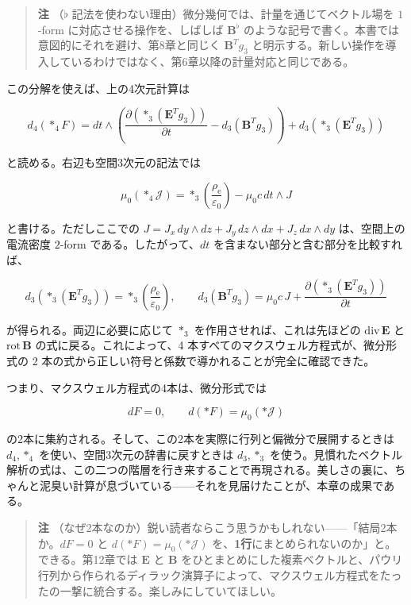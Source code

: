 \documentclass[a4paper,12pt,openany]{book}
\begin{document}
\begin{quote}
\textbf{注} （\(\flat\)
記法を使わない理由）微分幾何では、計量を通じてベクトル場を \(1\)-form
に対応させる操作を、しばしば \(\mathbf{B}^\flat\)
のような記号で書く。本書では意図的にそれを避け、第8章と同じく
\(\mathbf{B}^T g_3\)
と明示する。新しい操作を導入しているわけではなく、第6章以降の計量対応と同じである。
\end{quote}

この分解を使えば、上の4次元計算は

\[
d_4(\ast_4F)=dt\wedge\left(\frac{\partial(\ast_3(\mathbf{E}^T g_3))}{\partial t}-d_3(\mathbf{B}^T g_3)\right)+d_3(\ast_3(\mathbf{E}^T g_3))
\]

と読める。右辺も空間3次元の記法では

\[
\mu_0(\ast_4\mathcal J)=\ast_3\left(\frac{\rho_{\mathrm e}}{\varepsilon_0}\right)-\mu_0 c\,dt\wedge J
\]

と書ける。ただしここでの
\(J=J_x\,dy\wedge dz+J_y\,dz\wedge dx+J_z\,dx\wedge dy\)
は、空間上の電流密度 \(2\)-form である。したがって、\(dt\)
を含まない部分と含む部分を比較すれば、

\[
d_3(\ast_3(\mathbf{E}^T g_3))=\ast_3\left(\frac{\rho_{\mathrm e}}{\varepsilon_0}\right),
\qquad
d_3(\mathbf{B}^T g_3)=\mu_0 c\,J+\frac{\partial(\ast_3(\mathbf{E}^T g_3))}{\partial t}
\]

が得られる。両辺に必要に応じて \(\ast_3\) を作用させれば、これは先ほどの
\(\mathrm{div}\,\mathbf E\) と \(\mathrm{rot}\,\mathbf B\)
の式に戻る。これによって、4 本すべてのマクスウェル方程式が、微分形式の 2
本の式から正しい符号と係数で導かれることが完全に確認できた。

つまり、マクスウェル方程式の4本は、微分形式では

\[dF = 0, \qquad d(\ast F) = \mu_0(\ast\mathcal{J})\]

の2本に集約される。そして、この2本を実際に行列と偏微分で展開するときは
\(d_4,\ast_4\) を使い、空間3次元の辞書に戻すときは \(d_3,\ast_3\)
を使う。見慣れたベクトル解析の式は、この二つの階層を行き来することで再現される。美しさの裏に、ちゃんと泥臭い計算が息づいている——それを見届けたことが、本章の成果である。

\begin{quote}
\textbf{注}
（なぜ2本なのか）鋭い読者ならこう思うかもしれない——「結局2本か。\(dF=0\)
と \(d(\ast F)=\mu_0(\ast\mathcal{J})\)
を、\textbf{1行}にまとめられないのか」と。できる。第12章では
\(\mathbf{E}\) と \(\mathbf{B}\)
をひとまとめにした複素ベクトルと、パウリ行列から作られるディラック演算子によって、マクスウェル方程式をたったの一撃に統合する。楽しみにしていてほしい。
\end{quote}
\end{document}
